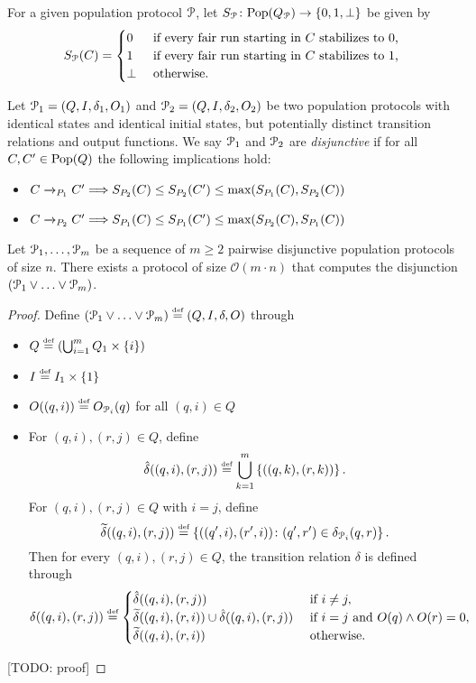 
For a given population protocol $\mathcal{P}$, let 
$S_{\mathcal{P}} \colon \mathrm{Pop}(Q_{\mathcal{P}}) \rightarrow \left\{0, 1, \bot\right\}$ be given by
$$S_{\mathcal{P}}(C) = \begin{cases}
         0 & \text{ if  every fair run starting in $C$ stabilizes to $0$, } \\
         1 & \text{ if every fair run starting in $C$ stabilizes to $1$, } \\
         \bot & \text{ otherwise. }
         \end{cases}
$$

Let $\mathcal{P}_1 = (Q, I, \delta_1, O_1)$ and $\mathcal{P}_2 = (Q, I, \delta_2, O_2)$ 
be two population protocols with identical states and identical initial states, 
but potentially distinct transition relations and output functions. 
We say $\mathcal{P}_1$ and $\mathcal{P}_2$ are \emph{disjunctive} if for all $C, C' \in \mathrm{Pop}(Q)$
the following implications hold:
\begin{itemize}
	\item $C \xrightarrow{}_{P_1} C' \Longrightarrow
	       S_{P_2}(C) \leq S_{P_2}(C') \leq \text{max}(S_{P_1}(C), S_{P_2}(C))$
	\item $C \xrightarrow{}_{P_2} C' \Longrightarrow 
	       S_{P_1}(C) \leq S_{P_1}(C') \leq \text{max}(S_{P_2}(C), S_{P_1}(C))$
\end{itemize}

\begin{lemma}
	 Let $\mathcal{P}_1, \ldots, \mathcal{P}_m$ be a sequence of $m \geq 2$  
	pairwise disjunctive population protocols of size $n$.
	There exists a protocol of size 
	$\mathcal{O}\left(m \cdot  n \right)$ that computes the 
	disjunction $(\mathcal{P}_1 \lor \ldots \lor \mathcal{P}_m)$.
\end{lemma}
\begin{proof}
	Define $(\mathcal{P}_1 \lor \ldots \lor \mathcal{P}_m) \stackrel{\scriptscriptstyle\text{def}}{=} (Q, I, \delta, O)$ through 
	\begin{itemize}
		\item $Q \stackrel{\scriptscriptstyle\text{def}}{=} \left(\bigcup_{i=1}^m Q_1 \times \left\{i\right\}\right)$
		\item $I \stackrel{\scriptscriptstyle\text{def}}{=} I_1 \times \left\{1\right\}$
		\item $O((q, i)) \stackrel{\scriptscriptstyle\text{def}}{=} O_{\mathcal{P}_i}(q)$ for all $(q, i) \in Q$
		\item For $(q, i), (r, j) \in Q$, define 
			  $$\hat{\delta}((q, i), (r, j)) \stackrel{\scriptscriptstyle\text{def}}{=} \bigcup_{k=1}^m 
			  \left\{((q, k), (r, k))\right\}.$$
			  For $(q, i), (r, j) \in Q$ with $i = j$, define 
			  $$\widetilde{\delta}((q, i), (r, j)) \stackrel{\scriptscriptstyle\text{def}}{=} \left\{((q', i), (r', i)) 
			  \colon (q', r') \in \delta_{\mathcal{P}_i}(q, r)\right\}.$$
			  Then for every $(q, i), (r, j) \in Q$, the transition relation 
			  $\delta$ is defined through
			  $$
			  \delta((q, i), (r, j)) \stackrel{\scriptscriptstyle\text{def}}{=} 
			  \begin{cases}
			  	\hat{\delta}((q, i), (r, j)) & \text{ if } i \neq j, \\
			  	\widetilde{\delta}((q, i), (r, i)) \cup \hat{\delta}((q, i), (r, j)) & 
			  	\text{ if } i = j \text{ and } O(q) \land O(r) = 0, \\
			  	\widetilde{\delta}((q, i), (r, i)) & \text{ otherwise.}
			  \end{cases}
			  $$
	\end{itemize}
	[TODO: proof]
\end{proof} 